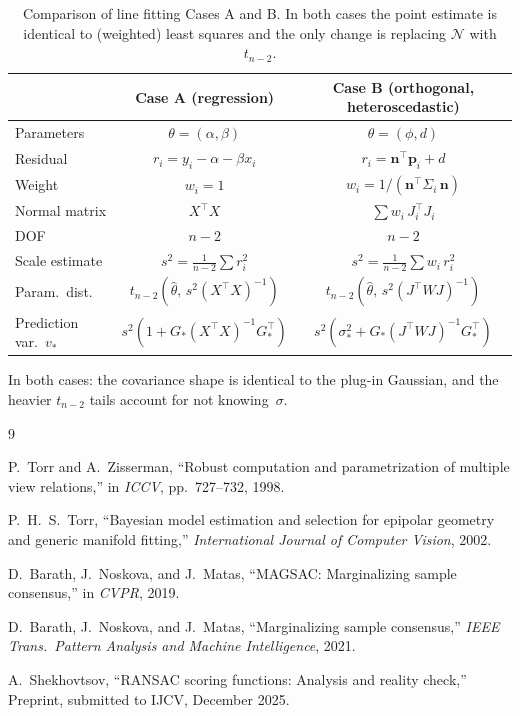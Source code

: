 \documentclass[11pt]{article}
\newcommand{\Normal}{\mathcal{N}}
\begin{document}
\begin{table}[h]
\centering
\begin{tabular}{lcc}
  \toprule
  & Case A (regression) & Case B (orthogonal, heteroscedastic) \\
  \midrule
  Parameters & $\theta = (\alpha, \beta)$ & $\theta = (\phi, d)$ \\
  Residual & $r_i = y_i - \alpha - \beta x_i$ & $r_i = \mathbf{n}^\top \mathbf{p}_i + d$ \\
  Weight & $w_i = 1$ & $w_i = 1/(\mathbf{n}^\top \Sigma_i\, \mathbf{n})$ \\
  Normal matrix & $X^\top X$ & $\sum w_i\, J_i^\top J_i$ \\
  DOF & $n - 2$ & $n - 2$ \\
  Scale estimate & $s^2 = \frac{1}{n-2}\sum r_i^2$
    & $s^2 = \frac{1}{n-2}\sum w_i\, r_i^2$ \\
  Param.\ dist.\ & $t_{n-2}(\hat\theta,\, s^2(X^\top X)^{-1})$
    & $t_{n-2}(\hat\theta,\, s^2(J^\top W J)^{-1})$ \\
  Prediction var.\ $v_*$ & $s^2(1 + G_*(X^\top X)^{-1}G_*^\top)$
    & $s^2(\sigma_*^2 + G_*(J^\top W J)^{-1}G_*^\top)$ \\
  \bottomrule
\end{tabular}
\caption{Comparison of line fitting Cases A and B.  In both cases the
  point estimate is identical to (weighted) least squares and the only
  change is replacing $\Normal$ with $t_{n-2}$.}
\label{tab:line-comparison}
\end{table}

\noindent In both cases: the covariance shape is identical to the plug-in
Gaussian, and the heavier $t_{n-2}$ tails account for not knowing~$\sigma$.


\begin{thebibliography}{9}

P.~Torr and A.~Zisserman,
``Robust computation and parametrization of multiple view relations,''
in \emph{ICCV}, pp.~727--732, 1998.

P.~H.~S.~Torr,
``Bayesian model estimation and selection for epipolar geometry and
generic manifold fitting,''
\emph{International Journal of Computer Vision}, 2002.

D.~Barath, J.~Noskova, and J.~Matas,
``MAGSAC: Marginalizing sample consensus,''
in \emph{CVPR}, 2019.

D.~Barath, J.~Noskova, and J.~Matas,
``Marginalizing sample consensus,''
\emph{IEEE Trans.\ Pattern Analysis and Machine Intelligence}, 2021.

A.~Shekhovtsov,
``RANSAC scoring functions: Analysis and reality check,''
Preprint, submitted to IJCV, December 2025.

\end{thebibliography}
\end{document}
